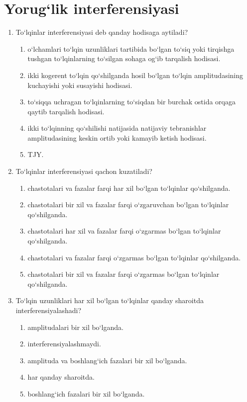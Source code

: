 

\section{Yorug‘lik interferensiyasi}




\begin{enumerate}

\item To‘lqinlar interferensiyasi deb qanday hodisaga aytiladi?
\begin{enumerate}[label=\Alph*)]
\item o‘lchamlari to‘lqin uzunliklari tartibida bo‘lgan to‘siq yoki tirqishga tushgan to‘lqinlarning to‘silgan sohaga og‘ib tarqalish hodisasi.
\item ikki kogerent to‘lqin qo‘shilganda hosil bo‘lgan to‘lqin amplitudasining kuchayishi yoki susayishi hodisasi.
\item to‘siqqa uchragan to‘lqinlarning to‘siqdan bir burchak ostida orqaga qaytib tarqalish hodisasi.
\item ikki to‘lqinning qo‘shilishi natijasida natijaviy tebranishlar amplitudasining keskin ortib yoki kamayib ketish hodisasi.
\item TJY.
\end{enumerate}

\item To‘lqinlar interferensiyasi qachon kuzatiladi?
\begin{enumerate}[label=\Alph*)]
\item chastotalari va fazalar farqi har xil bo‘lgan to‘lqinlar qo‘shilganda.
\item chastotalari bir xil va fazalar farqi o‘zgaruvchan bo‘lgan to‘lqinlar qo‘shilganda.
\item chastotalari har xil va fazalar farqi o‘zgarmas bo‘lgan to‘lqinlar qo‘shilganda.
\item chastotalari va fazalar farqi o‘zgarmas bo‘lgan to‘lqinlar qo‘shilganda.
\item chastotalari bir xil va fazalar farqi o‘zgarmas bo‘lgan to‘lqinlar qo‘shilganda.
\end{enumerate}

\item To‘lqin uzunliklari har xil bo‘lgan to‘lqinlar qanday sharoitda interferensiyalashadi?
\begin{enumerate}[label=\Alph*)]
\item amplitudalari bir xil bo‘lganda.
\item interferensiyalashmaydi.
\item amplituda va boshlang‘ich fazalari bir xil bo‘lganda.
\item har qanday sharoitda.
\item boshlang‘ich fazalari bir xil bo‘lganda.
\end{enumerate}


\end{enumerate}
